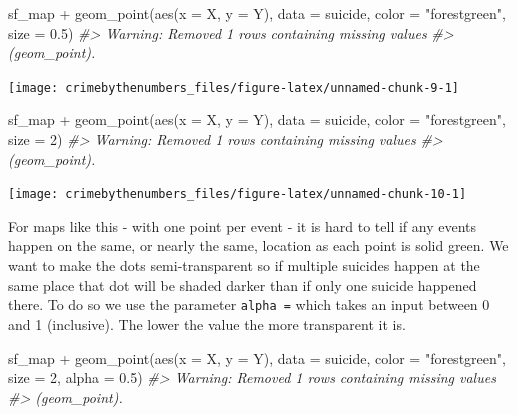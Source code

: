 \documentclass[
]{krantz}
\makeatletter
\newenvironment{Shaded}{\begin{snugshade}}{\end{snugshade}}
\newcommand{\AttributeTok}[1]{\textcolor[rgb]{0.61,0.61,0.61}{#1}}
\newcommand{\CommentTok}[1]{\textcolor[rgb]{0.37,0.37,0.37}{\textit{#1}}}
\newcommand{\DecValTok}[1]{\textcolor[rgb]{0.06,0.06,0.06}{#1}}
\newcommand{\FloatTok}[1]{\textcolor[rgb]{0.06,0.06,0.06}{#1}}
\newcommand{\FunctionTok}[1]{\textcolor[rgb]{0,0,0}{#1}}
\newcommand{\NormalTok}[1]{#1}
\newcommand{\SpecialCharTok}[1]{\textcolor[rgb]{0,0,0}{#1}}
\newcommand{\StringTok}[1]{\textcolor[rgb]{0.5,0.5,0.5}{#1}}
\newenvironment{kframe}{%
\medskip{}
\setlength{\fboxsep}{.8em}
 \def\at@end@of@kframe{}%
 \ifinner\ifhmode%
  \def\at@end@of@kframe{\end{minipage}}%
  \begin{minipage}{\columnwidth}%
 \fi\fi%
 \def\FrameCommand##1{\hskip\@totalleftmargin \hskip-\fboxsep
 \colorbox{shadecolor}{##1}\hskip-\fboxsep
     \hskip-\linewidth \hskip-\@totalleftmargin \hskip\columnwidth}%
 \MakeFramed {\advance\hsize-\width
   \@totalleftmargin\z@ \linewidth\hsize
   \@setminipage}}%
 {\par\unskip\endMakeFramed%
 \at@end@of@kframe}
\renewenvironment{Shaded}{\begin{kframe}}{\end{kframe}}
\makeatother
\begin{document}
\begin{Shaded}
\begin{Highlighting}[]
\NormalTok{sf\_map }\SpecialCharTok{+} \FunctionTok{geom\_point}\NormalTok{(}\FunctionTok{aes}\NormalTok{(}\AttributeTok{x =}\NormalTok{ X, }\AttributeTok{y =}\NormalTok{ Y), }\AttributeTok{data =}\NormalTok{ suicide, }\AttributeTok{color =} \StringTok{"forestgreen"}\NormalTok{,}
  \AttributeTok{size =} \FloatTok{0.5}\NormalTok{)}
\CommentTok{\#\textgreater{} Warning: Removed 1 rows containing missing values}
\CommentTok{\#\textgreater{} (geom\_point).}
\end{Highlighting}
\end{Shaded}

\begin{center}\texttt{[image: crimebythenumbers\_files/figure-latex/unnamed-chunk-9-1]} \end{center}

\begin{Shaded}
\begin{Highlighting}[]
\NormalTok{sf\_map }\SpecialCharTok{+} \FunctionTok{geom\_point}\NormalTok{(}\FunctionTok{aes}\NormalTok{(}\AttributeTok{x =}\NormalTok{ X, }\AttributeTok{y =}\NormalTok{ Y), }\AttributeTok{data =}\NormalTok{ suicide, }\AttributeTok{color =} \StringTok{"forestgreen"}\NormalTok{,}
  \AttributeTok{size =} \DecValTok{2}\NormalTok{)}
\CommentTok{\#\textgreater{} Warning: Removed 1 rows containing missing values}
\CommentTok{\#\textgreater{} (geom\_point).}
\end{Highlighting}
\end{Shaded}

\begin{center}\texttt{[image: crimebythenumbers\_files/figure-latex/unnamed-chunk-10-1]} \end{center}

For maps like this - with one point per event - it is hard to tell if any events happen on the same, or nearly the same, location as each point is solid green. We want to make the dots semi-transparent so if multiple suicides happen at the same place that dot will be shaded darker than if only one suicide happened there. To do so we use the parameter \texttt{alpha\ =} which takes an input between 0 and 1 (inclusive). The lower the value the more transparent it is.

\begin{Shaded}
\begin{Highlighting}[]
\NormalTok{sf\_map }\SpecialCharTok{+} \FunctionTok{geom\_point}\NormalTok{(}\FunctionTok{aes}\NormalTok{(}\AttributeTok{x =}\NormalTok{ X, }\AttributeTok{y =}\NormalTok{ Y), }\AttributeTok{data =}\NormalTok{ suicide, }\AttributeTok{color =} \StringTok{"forestgreen"}\NormalTok{,}
  \AttributeTok{size =} \DecValTok{2}\NormalTok{, }\AttributeTok{alpha =} \FloatTok{0.5}\NormalTok{)}
\CommentTok{\#\textgreater{} Warning: Removed 1 rows containing missing values}
\CommentTok{\#\textgreater{} (geom\_point).}
\end{Highlighting}
\end{Shaded}
\end{document}
